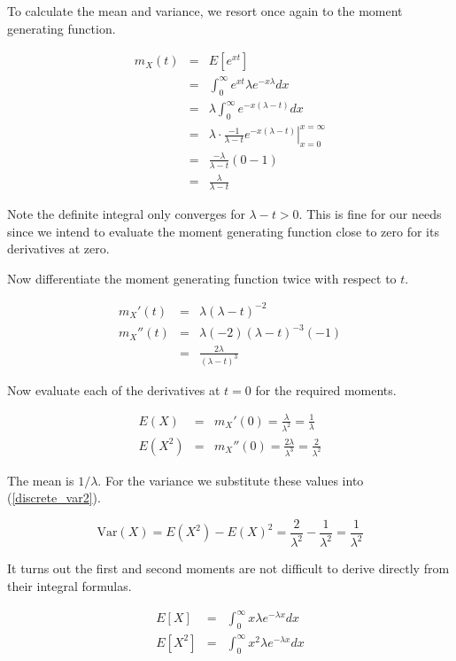 \documentclass[]{article}
\begin{document}
To calculate the mean and variance, we resort once again to the
moment generating function.

\begin{eqnarray}
m_X(t) & = & E[e^{xt}] \nonumber \\
   & = & \int_0^{\infty} e^{xt} \lambda e^{-x \lambda} dx \nonumber \\
   & = & \lambda \int_0^{\infty} e^{-x(\lambda - t)} dx \nonumber \\
   & = & \left. \lambda \cdot \frac{-1}{\lambda - t} e^{-x(\lambda - t)}
      \right|_{x=0}^{x=\infty} \nonumber \\
   & = & \frac{-\lambda}{\lambda - t} (0 - 1) \nonumber \\
   & = & \frac{\lambda}{\lambda - t} \label{exp_mgf}
\end{eqnarray}

Note the definite integral only converges for $\lambda - t > 0$.
This is fine for our needs since we intend to evaluate the moment
generating function close to zero for its derivatives at zero.

Now differentiate the moment generating function twice with
respect to $t$.

\begin{eqnarray*}
m_X'(t) & = & \lambda(\lambda - t)^{-2}  \\
m_X''(t) & = & \lambda (-2)(\lambda - t)^{-3}(-1) \\
   & = & \frac{2 \lambda}{(\lambda - t)^3}
\end{eqnarray*}

Now evaluate each of the derivatives at $t=0$ for the
required moments.

\begin{eqnarray}
E(X) & = & m_X'(0)
   = \frac{\lambda}{\lambda^2}
   = \frac{1}{\lambda} \label{expon_mean} \\
E(X^2) & = & m_X''(0) 
   = \frac{2 \lambda}{\lambda^3}
   = \frac{2}{\lambda^2} \nonumber
\end{eqnarray}

The mean is $1 / \lambda$.  For the variance we
substitute these values into (\ref{discrete_var2}).

$$
\mbox{Var}(X) = E(X^2) - E(X)^2
   = \frac{2}{\lambda^2} - \frac{1}{\lambda^2}
   = \frac{1}{\lambda^2} \label{expon_var}
$$

It turns out the first and second moments are not difficult
to derive directly from their integral formulas.

\begin{eqnarray*}
E[X] & = & \int_0^{\infty} x \lambda e^{-\lambda x} dx \\
E[X^2] & = & \int_0^{\infty} x^2 \lambda e^{-\lambda x} dx
\end{eqnarray*}
\end{document}
